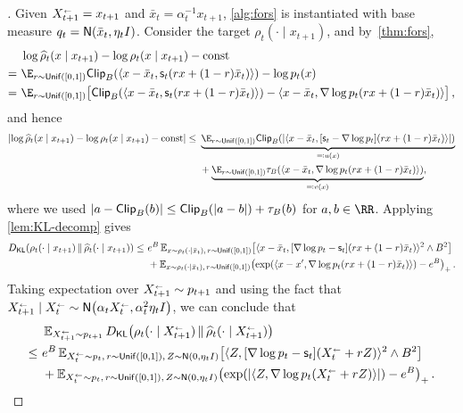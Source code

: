 \begin{proof}[]
Given $X^{{\scriptscriptstyle\leftarrow}}_{t+1} = x_{t+1}$ and $\bar x_t = \alpha_t^{-1} x_{t+1}$, \cref{alg:fors} is instantiated with base measure $q_t=\normal{\bar x_t,\eta_t\Id}$. Consider the target $\rho_t(\cdot \mid x_{t+1})$, and by~\cref{thm:fors},
\begin{align*}
    &~\log \wh\rho_t(x\mid x_{t+1}) - \log \rho_t(x\mid x_{t+1})-\const \\
    =&~ \E_{r\sim \Unif([0,1])} \pclip{\langle x-\bar x_t, \scf_t(rx+(1-r)\bar x_t)\rangle} - \log p_t(x)\\
    =&~ \E_{r\sim \Unif([0,1])}\brk[\big]{\pclip{\langle x-\bar x_t, \scf_t(rx+(1-r)\bar x_t)\rangle} - \langle x-\bar x_t,\nabla \log p_t(rx + (1-r)\bar x_t)\rangle}\,,
\end{align*}
and hence
\begin{align*}
    \abs{\log \wh\rho_t(x\mid x_{t+1}) - \log \rho_t(x\mid x_{t+1})-\const}\leq&~ \underbrace{\E_{r\sim\Unif([0,1])}\pclip{\abs{\langle x-\bar x_t, [\scf_t - \nabla \log p_t](rx+(1-r)\bar x_t)\rangle}}}_{\eqqcolon u(x)}  \\
    &~ + {\underbrace{\E_{r\sim \Unif([0,1])}\trunc{\langle x-\bar x_t, \nabla \log p_t(rx+(1-r)\bar x_t)\rangle}}_{\eqqcolon v(x)}},
\end{align*}
where we used $\lvert a-\mathsf{Clip}_{B}(b)\rvert\leq \mathsf{Clip}_{B}(\lvert a-b\rvert)+\tau_{B}(b)$ for $a,b\in\RR$.
Applying \cref{lem:KL-decomp} gives
\begin{align*}
    \Dkl{\rho_t(\cdot\mid x_{t+1})}{\wh\rho_t(\cdot\mid x_{t+1})}
    \leq&~ e^\B\En_{x\sim \rho_t(\cdot\mid \bar x_t),\, \lr\sim \Unif([0,1])}\brk*{ \tri{x-\bar x_t,[\nabla \log p_t-\scf_t](\lr x+(1-\lr)\bar x_t)}^2\wedge \B^2 } \\
    &~+\En_{x\sim \rho_t(\cdot\mid \bar x_t),\, \lr\sim \Unif([0,1])}\prn*{ \exp\prn*{\tri{x-x',\nabla \log p_t(\lr x+(1-\lr)\bar x_t)}} - e^\B }_+\,.
\end{align*}
Taking expectation over $X^{{\scriptscriptstyle\leftarrow}}_{t+1}\sim p_{t+1}$ and using the fact that $\xr{t+1}\mid \xr{t}\sim \normal{\alpha_t\xr{t},\alpha_t^2\eta_t\Id}$, we can conclude that
\begin{align*}
    &~\En_{\xr{t+1}\sim p_{t+1}} \kl{\rho_t(\cdot\mid \xr{t+1})}{\wh\rho_t(\cdot\mid \xr{t+1})} \\
    \leq&~ e^\B\En_{\xr{t}\sim p_t,\, \lr\sim \Unif([0,1]),\,Z\sim \normal{0,\eta_t\Id}}\brk*{ \tri{Z,[\nabla \log p_t-\scf_t](\xr{t}+\lr Z)}^2\wedge \B^2 } \\
    &~+\En_{\xr{t}\sim p_t,\, \lr\sim \Unif([0,1]),\,Z\sim \normal{0,\eta_t\Id}}\prn*{ \exp\prn*{\abs{\tri{Z,\nabla \log p_t(\xr{t}+\lr Z)}}} - e^\B }_+\,.

\end{align*}
\end{proof}
